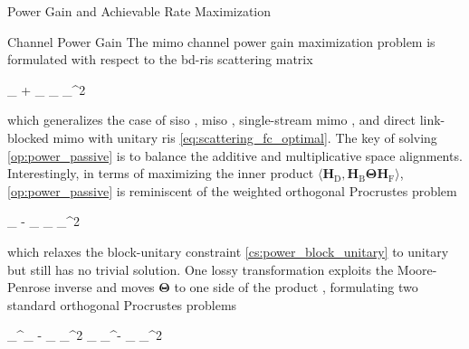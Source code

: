 \documentclass[journal]{IEEEtran}
\begin{document}
\begin{section}{Power Gain and Achievable Rate Maximization}\label{sc:power_rate}
	\begin{subsection}{Channel Power Gain}\label{sc:power}
		The \gls{mimo} channel power gain maximization problem is formulated with respect to the \gls{bd}-\gls{ris} scattering matrix
		\begin{maxi!}
			{\scriptstyle{\mathbf{\Theta}}}{\lVert {}_ + _ \mathbf{\Theta} _ \rVert _^2}{\label{op:power_passive}}{\label{ob:power_passive}}
		\end{maxi!}
		which generalizes the case of \gls{siso} \cite{Shen2020a}, \gls{miso} \cite{Santamaria2023,Fang2023}, single-stream \gls{mimo} \cite{Nerini2023,Nerini2023b}, and direct link-blocked \gls{mimo} with unitary \gls{ris} \eqref{eq:scattering_fc_optimal}.
		The key of solving \eqref{op:power_passive} is to balance the additive and multiplicative space alignments.
		Interestingly, in terms of maximizing the inner product $\langle \mathbf{H}_\mathrm{D}, \mathbf{H}_\mathrm{B} \mathbf{\Theta} \mathbf{H}_\mathrm{F} \rangle$, \eqref{op:power_passive} is reminiscent of the weighted orthogonal Procrustes problem \cite{Gower2004}
		\begin{mini!}
			{\scriptstyle{\mathbf{\Theta}}}{\lVert {}_ - _ \mathbf{\Theta} _ \rVert _^2}{\label{op:weighted_orthogonal_procrustes}}{}
		\end{mini!}
		which relaxes the block-unitary constraint \eqref{cs:power_block_unitary} to unitary but still has no trivial solution.
		One lossy transformation exploits the Moore-Penrose inverse and moves $\mathbf{\Theta}$ to one side of the product \cite{Bell2003}, formulating two standard orthogonal Procrustes problems
		\begin{mini!}
			{\scriptstyle{\mathbf{\Theta}}}{\lVert {}_^\dagger {}_ - \mathbf{\Theta} _ \rVert _^2  \lVert {}_ _^\dagger - _ \mathbf{\Theta} \rVert _^2}{\label{op:standard_orthogonal_procrustes}}{}
			\addConstraint{\mathbf{\Theta}^\mathsf{H} \mathbf{\Theta}=\mathbf{I},}{}{}
		\end{mini!}

\end{subsection}
\end{section}
\end{document}

